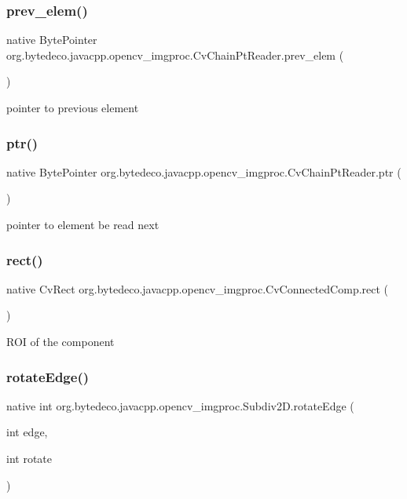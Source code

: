 \subsubsection{\texorpdfstring{prev\+\_\+elem()}{prev\_elem()}}
{\footnotesize\ttfamily native Byte\+Pointer org.\+bytedeco.\+javacpp.\+opencv\+\_\+imgproc.\+Cv\+Chain\+Pt\+Reader.\+prev\+\_\+elem (\begin{DoxyParamCaption}{ }\end{DoxyParamCaption})}

pointer to previous element \mbox{\label{group__imgproc_ga985f30fcc54d909935454e69374f4f7b}} 
\subsubsection{\texorpdfstring{ptr()}{ptr()}}
{\footnotesize\ttfamily native Byte\+Pointer org.\+bytedeco.\+javacpp.\+opencv\+\_\+imgproc.\+Cv\+Chain\+Pt\+Reader.\+ptr (\begin{DoxyParamCaption}{ }\end{DoxyParamCaption})}

pointer to element be read next \mbox{\label{group__imgproc_ga1505cdc461c1c929ad7ee5f2df4b166e}} 
\subsubsection{\texorpdfstring{rect()}{rect()}}
{\footnotesize\ttfamily native Cv\+Rect org.\+bytedeco.\+javacpp.\+opencv\+\_\+imgproc.\+Cv\+Connected\+Comp.\+rect (\begin{DoxyParamCaption}{ }\end{DoxyParamCaption})}

R\+OI of the component \mbox{\label{group__imgproc_gabfc2f5bafd97c684939d0d74ee719f70}} 
\subsubsection{\texorpdfstring{rotate\+Edge()}{rotateEdge()}}
{\footnotesize\ttfamily native int org.\+bytedeco.\+javacpp.\+opencv\+\_\+imgproc.\+Subdiv2\+D.\+rotate\+Edge (\begin{DoxyParamCaption}\item[{int}]{edge,  }\item[{int}]{rotate }\end{DoxyParamCaption})}



